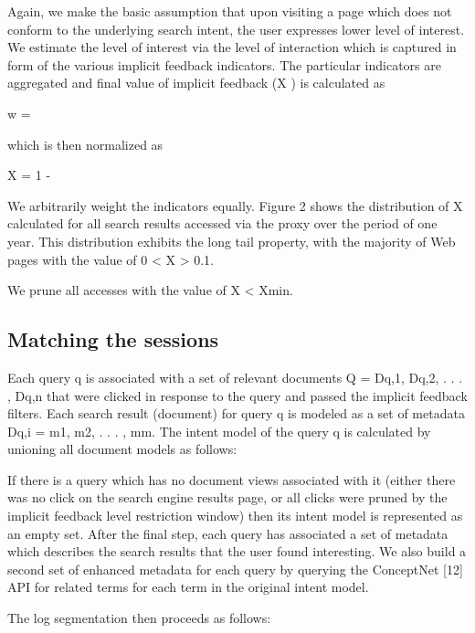 \documentclass{acm_proc_article-sp} %
\begin{document}
Again, we make the basic assumption that upon visiting a
page which does not conform to the underlying search intent,
the user expresses lower level of interest. We estimate the
level of interest via the level of interaction which is captured
in form of the various implicit feedback indicators. The particular
indicators are aggregated and final value of implicit
feedback (X ) is calculated as

w = 

which is then normalized as

X = 1 - 

We arbitrarily weight the indicators equally. Figure 2 shows
the distribution of X calculated for all search results accessed
via the proxy over the period of one year. This distribution
exhibits the long tail property, with the majority
of Web pages with the value of 0 < X > 0.1.

We prune all accesses with the value of X < Xmin.

\subsection{ Matching the sessions}

Each query q is associated with a set of relevant documents
Q = {Dq,1, Dq,2, . . . , Dq,n} that were clicked in response to
the query and passed the implicit feedback filters. Each
search result (document) for query q is modeled as a set of
metadata Dq,i = {m1, m2, . . . , mm}.
The intent model of the query q is calculated by unioning
all document models as follows:

If there is a query which has no document views associated
with it (either there was no click on the search engine results
page, or all clicks were pruned by the implicit feedback level
restriction window) then its intent model is represented as
an empty set.
After the final step, each query has associated a set of metadata
which describes the search results that the user found
interesting. We also build a second set of enhanced metadata
for each query by querying the ConceptNet [12] API
for related terms for each term in the original intent model.

The log segmentation then proceeds as follows:
\end{document}
